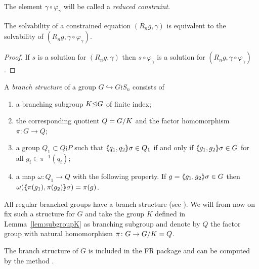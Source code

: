 \documentclass[a4paper,11pt]{amsart}
\begin{document}
 The element $\gamma \circ \varphi_\gamma$ will be called a \emph{reduced constraint}.

\begin{lem} \label{lem:solvabilityWithReducedConstraint}
 The solvability of a constrained equation $(R_n g,\gamma)$ is equivalent to the solvability of $(R_n g,\gamma\circ \varphi_\gamma)$.
\end{lem}
 \begin{proof}
 If $s$ is a solution for $(R_n g,\gamma)$ then $s\circ \varphi_\gamma$ is
 a solution for $(R_n g,\gamma\circ \varphi_\gamma)$. 
\end{proof}


\begin{defi} 
A \emph{branch structure} of a group $G\hookrightarrow G \wr S_n$ consists of  
\begin{enumerate}
 \item a branching subgroup $K{\mathrel\trianglelefteq} G$ of finite index;
 \item the corresponding quotient $Q={G/K}$ and the factor homomorphism $\pi\colon G \to Q$;
 \item a group $Q_1 \subset Q \wr P$ such that $\langle\negthickspace\langle q_1,q_2\rangle\negthickspace\rangle\sigma\in Q_1$ if and only if $\langle\negthickspace\langle g_1,g_2\rangle\negthickspace\rangle\sigma \in G$ for all $g_i \in \pi^{-1}(q_i)$;
 \item a map $\omega\colon Q_1 \to Q$ with the following property. If $g=\langle\negthickspace\langle g_1,g_2\rangle\negthickspace\rangle\sigma \in G$ then $\omega(\langle\negthickspace\langle\pi(g_1),\pi(g_2)\rangle\negthickspace\rangle\sigma) = \pi(g)$.
\end{enumerate}
\end{defi}
All regular branched groups have a branch structure
(see {\cite[Remark after Definition~5.1]{Bartholdi:RepresentationZetaFunctions}}).
We will from now on fix such a structure for $G$ and take 
the group $K$ defined in Lemma~\ref{lem:subgroupK} as branching subgroup and 
denote by $Q$ the factor group with natural homomorphism $\pi\colon G \to {G/K}=Q$.

 The branch structure of $G$ is included in the FR package and can be computed by the method
  .



\end{document}
